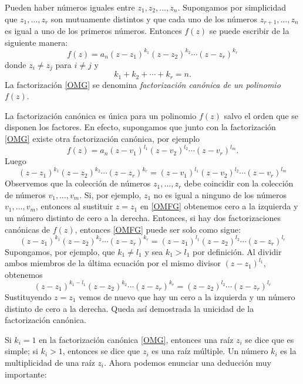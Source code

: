 \newpage

Pueden haber números iguales entre $z_1,  z_2, \dots, z_n$. Supongamos por simplicidad que $z_1, \dots, z_r$ son mutuamente distintos y que cada uno de los números $z_{r+1}, \dots, z_n$ es igual a uno de los primeros números. Entonces $f(z)$ se puede escribir de la siguiente manera:
\begin{equation}
    f(z)=a_n (z-z_1)^{k_1}(z-z_2)^{k_2} \cdots (z-z_r)^{k_r} \label{OMG}
\end{equation}
donde $z_i \neq z_j$ para $i \neq j$ y
$$k_1+k_2+\cdots +k_r=n.$$
La factorización \eqref{OMG} se denomina \textit{factorización canónica de un polinomio} $f(z)$.

La factorización canónica es única para un polinomio $f(z)$ salvo el orden que se disponen los factores. En efecto, supongamos que junto con la factorización \eqref{OMG} existe otra factorización canónica, por ejemplo
$$f(z)=a_n (z-v_1)^{l_1}(z-v_2)^{l_2} \cdots (z-v_r)^{l_m}.$$
Luego
\begin{equation}
    (z-z_1)^{k_1}(z-z_2)^{k_2} \cdots (z-z_r)^{k_r} = (z-v_1)^{l_1}(z-v_2)^{l_2} \cdots (z-v_r)^{l_m} \label{OMFG}
\end{equation}
Observemos que la colección de números $z_1,  \dots,  z_r$ debe coincidir con la colección de números $v_1,  \dots,  v_m$. Si, por ejemplo, $z_1$ no es igual a ninguno de los números $v_1,  \dots,  v_m$, entonces al sustituir $z = z_1$ en \eqref{OMFG} obtenemos cero a la izquierda y un número distinto de cero a la derecha. Entonces, si hay dos factorizaciones canónicas de $f(z)$, entonces \eqref{OMFG} puede ser solo como sigue:
$$(z-z_1)^{k_1}(z-z_2)^{k_2} \cdots (z-z_r)^{k_r} = (z-z_1)^{l_1}(z-z_2)^{l_2} \cdots (z-z_r)^{l_r}$$
Supongamos, por ejemplo, que $k_1 \neq l_1$ y sea $k_1 > l_1$ por definición. Al dividir ambos miembros de la última ecuación por el mismo divisor $(z - z_1)^{l_1}$, obtenemos
$$(z-z_1)^{k_1-l_1}(z-z_2)^{k_2} \cdots (z-z_r)^{k_r} = (z-z_2)^{l_2} \cdots (z-z_r)^{l_r}$$
Sustituyendo $z = z_1$ vemos de nuevo que hay un cero a la izquierda y un número distinto de cero a la derecha. Queda así demostrada la unicidad de la factorización canónica.

Si $k_i = 1$ en la factorización canónica \eqref{OMG}, entonces una raíz $z_i$ se dice que es simple; si $k_i > 1$, entonces se dice que $z_i$ es una raíz múltiple. Un número $k_i$ es la multiplicidad de una raíz $z_i$. Ahora podemos enunciar una deducción muy importante:

